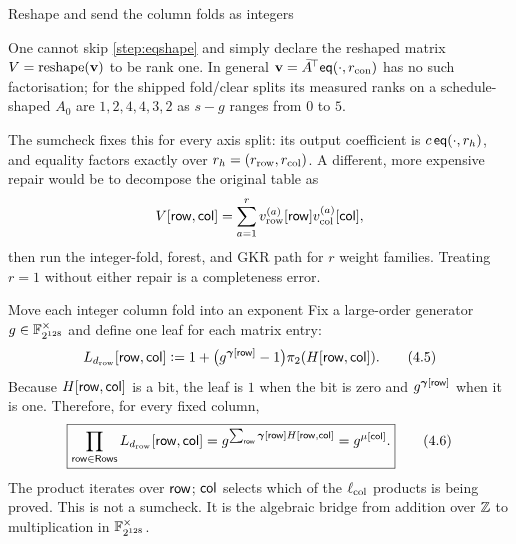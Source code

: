 \begin{step}{Reshape and send the column folds as integers}{%
}
\begin{warning}
\label{warn:rank1}
One cannot skip \cref{step:eqshape} and simply declare the reshaped matrix
$V=\operatorname{reshape}(\mathbf{v})$ to be rank one.  In general
$\mathbf{v}=\bar A^{\!\top}\mathsf{eq}(\cdot,r_{\rm con})$ has no such factorisation; for the
shipped fold/clear splits its measured ranks on a schedule-shaped $A_0$ are
$1,2,4,4,3,2$ as $s-g$ ranges from $0$ to $5$.

The sumcheck fixes this for every axis split: its output coefficient is
$c\,\mathsf{eq}(\cdot,r_h)$, and equality factors exactly over
$r_h=(r_{\rm row},r_{\rm col})$.  A different, more expensive repair would be
to decompose the original table as
\[
  V[\mathsf{row},\mathsf{col}]
  =\sum_{a=1}^{r}v_{\mathrm{row}}^{(a)}[\mathsf{row}]
        v_{\mathrm{col}}^{(a)}[\mathsf{col}],
\]
then run the integer-fold, forest, and GKR path for $r$ weight families.
Treating $r=1$ without either repair is a completeness error.
\end{warning}

\end{step}

\begin{step}{Move each integer column fold into an exponent}{%
}\label{step:exponent}
Fix a large-order generator $g\in\mathbb{F}_{2^{128}}^{\times}$ and define one leaf for
each matrix entry:
\[
  L_{d_{\mathrm{row}}}[\mathsf{row},\mathsf{col}]
  \vcentcolon=
  1+\bigl(g^{\bm{\gamma}[\mathsf{row}]}-1\bigr)
       \pi_2(H[\mathsf{row},\mathsf{col}]).                \tag{4.5}\label{eq:leafdef}
\]
Because $H[\mathsf{row},\mathsf{col}]$ is a bit, the leaf is $1$ when the bit is zero and
$g^{\bm{\gamma}[\mathsf{row}]}$ when it is one.  Therefore, for every fixed column,
\[
  \boxed{
  \prod_{\mathsf{row}\in\mathsf{Rows}}L_{d_{\mathrm{row}}}[\mathsf{row},\mathsf{col}]
  =g^{\sum_{\mathsf{row}}\bm{\gamma}[\mathsf{row}]H[\mathsf{row},\mathsf{col}]}
  =g^{\mu[\mathsf{col}]}.}                         \tag{4.6}
\]
The product iterates over $\mathsf{row}$; $\mathsf{col}$ selects which of the
$\ell_{\mathrm{col}}$ products is being proved.  This is not a sumcheck.  It is the
algebraic bridge from addition over $\mathbb{Z}$ to multiplication in
$\mathbb{F}_{2^{128}}^{\times}$.

\end{step}

